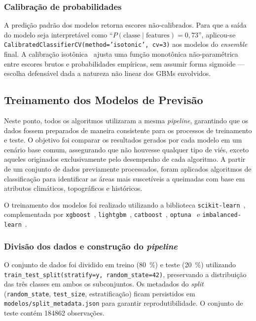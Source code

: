 \subsubsection{Calibração de probabilidades}
\label{subsec:metod_calibracao}

A predição padrão dos modelos retorna escores não-calibrados. Para que a saída do modelo seja interpretável como ``\(P(\text{classe} \mid \text{features}) = 0{,}73\)'', aplicou-se \texttt{CalibratedClassifierCV(method='isotonic', cv=3)} aos modelos do \emph{ensemble} final. A calibração isotônica~\cite{zadrozny2002transforming} ajusta uma função monotônica não-paramétrica entre escores brutos e probabilidades empíricas, sem assumir forma sigmoide --- escolha defensável dada a natureza não linear dos GBMs envolvidos.

\subsection{Treinamento dos Modelos de Previsão}
\label{sec:metod_treinamento}

Neste ponto, todos os algoritmos utilizaram a mesma \emph{pipeline}, garantindo que os dados fossem preparados de maneira consistente para os processos de treinamento e teste. O objetivo foi comparar os resultados gerados por cada modelo em um cenário base comum, assegurando que não houvesse qualquer tipo de viés, exceto aqueles originados exclusivamente pelo desempenho de cada algoritmo. A partir de um conjunto de dados previamente processados, foram aplicados algoritmos de classificação para identificar as áreas mais suscetíveis a queimadas com base em atributos climáticos, topográficos e históricos.

O treinamento dos modelos foi realizado utilizando a biblioteca \texttt{scikit-learn}~\cite{pedregosa2011scikit}, complementada por \texttt{xgboost}~\cite{chen2016xgboost}, \texttt{lightgbm}~\cite{ke2017lightgbm}, \texttt{catboost}~\cite{prokhorenkova2018catboost}, \texttt{optuna}~\cite{akiba2019optuna} e \texttt{imbalanced-learn}~\cite{lemaitre2017imbalanced}.

\subsubsection{Divisão dos dados e construção do \emph{pipeline}}

O conjunto de dados foi dividido em treino (\SI{80}{\percent}) e teste (\SI{20}{\percent}) utilizando \texttt{train\_test\_split(stratify=y, random\_state=42)}, preservando a distribuição das três classes em ambos os subconjuntos. Os metadados do \emph{split} (\texttt{random\_state}, \texttt{test\_size}, estratificação) ficam persistidos em \texttt{modelos/split\_metadata.json} para garantir reprodutibilidade. O conjunto de teste contém \num{184862} observações.

